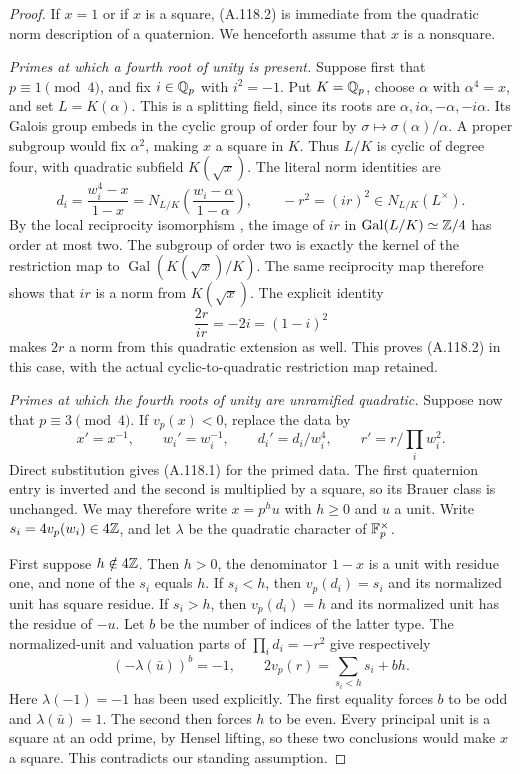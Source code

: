 \begin{proof}
If $x=1$ or if $x$ is a square, (A.118.2) is immediate
from the quadratic norm description of a quaternion.
We henceforth assume that $x$ is a nonsquare.

\emph{Primes at which a fourth root of unity is present.}
Suppose first that $p\equiv1\pmod4$, and fix $i\in\mathbb Q_p$
with $i^2=-1$.
Put $K=\mathbb Q_p$, choose $\alpha$ with $\alpha^4=x$, and set
$L=K(\alpha)$.
This is a splitting field, since its roots are
$\alpha,i\alpha,-\alpha,-i\alpha$.
Its Galois group embeds in the cyclic group of order four
by $\sigma\mapsto\sigma(\alpha)/\alpha$.
A proper subgroup would fix $\alpha^2$, making $x$ a square
in $K$.  Thus $L/K$ is cyclic of degree four, with quadratic
subfield $K(\sqrt{x})$.
The literal norm identities are
\[
 d_i=\frac{w_i^4-x}{1-x}
     =N_{L/K}\left(\frac{w_i-\alpha}{1-\alpha}\right),
 \qquad -r^2=(ir)^2\in N_{L/K}(L^\times).
\tag{A.118.6}
\]
By the local reciprocity isomorphism
\cite[Theorem 4.1.2]{BIR_KedlayaCFT}, the image of $ir$ in
$\operatorname{Gal}(L/K)\simeq\mathbb Z/4$ has order at most two.
The subgroup of order two is exactly the kernel of the
restriction map to $\operatorname{Gal}(K(\sqrt{x})/K)$.
The same reciprocity map therefore shows that $ir$ is a
norm from $K(\sqrt{x})$.
The explicit identity
\[
                     \frac{2r}{ir}=-2i=(1-i)^2
\tag{A.118.7}
\]
makes $2r$ a norm from this quadratic extension as well.
This proves (A.118.2) in this case, with the actual
cyclic-to-quadratic restriction map retained.

\emph{Primes at which the fourth roots of unity are unramified quadratic.}
Suppose now that $p\equiv3\pmod4$.
If $v_p(x)<0$, replace the data by
\[
 x'=x^{-1},\qquad w_i'=w_i^{-1},\qquad
 d_i'=d_i/w_i^4,\qquad r'=r/\prod_i w_i^2.
\tag{A.118.8}
\]
Direct substitution gives (A.118.1) for the primed data.
The first quaternion entry is inverted and the second is
multiplied by a square, so its Brauer class is unchanged.
We may therefore write $x=p^h u$ with $h\ge0$ and $u$ a
unit.  Write $s_i=4v_p(w_i)\in4\mathbb Z$, and let $\lambda$ be
the quadratic character of $\mathbb F_p^\times$.

First suppose $h\notin4\mathbb Z$.
Then $h>0$, the denominator $1-x$ is a unit with residue
one, and none of the $s_i$ equals $h$.
If $s_i<h$, then $v_p(d_i)=s_i$ and its normalized unit
has square residue.  If $s_i>h$, then $v_p(d_i)=h$ and its
normalized unit has the residue of $-u$.
Let $b$ be the number of indices of the latter type.
The normalized-unit and valuation parts of
$\prod_i d_i=-r^2$ give respectively
\[
       (-\lambda(\bar u))^b=-1,
       \qquad
       2v_p(r)=\sum_{s_i<h}s_i+bh.
\tag{A.118.9}
\]
Here $\lambda(-1)=-1$ has been used explicitly.
The first equality forces $b$ to be odd and
$\lambda(\bar u)=1$.
The second then forces $h$ to be even.
Every principal unit is a square at an odd prime, by
Hensel lifting, so these two conclusions would make $x$
a square.  This contradicts our standing assumption.


\end{proof}

